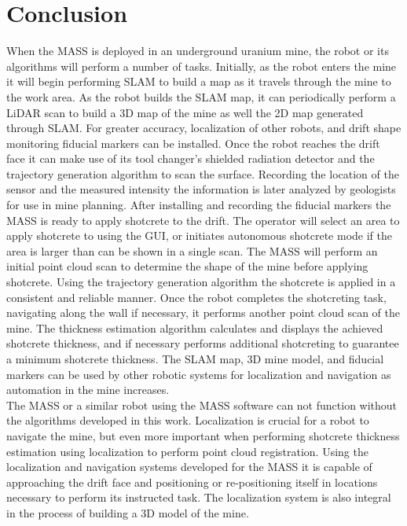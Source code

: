 \section{Conclusion}
When the MASS is deployed in an underground uranium mine, the robot or its algorithms will perform a number of tasks. Initially, as the robot enters the mine it will begin performing SLAM to build a map as it travels through the mine to the work area. As the robot builds the SLAM map, it can periodically perform a LiDAR scan to build a 3D map of the mine as well the 2D map generated through SLAM. For greater accuracy, localization of other robots, and drift shape monitoring fiducial markers can be installed. Once the robot reaches the drift face it can make use of its tool changer's shielded radiation detector and the trajectory generation algorithm to scan the surface. Recording the location of the sensor and the measured intensity the information is later analyzed by geologists for use in mine planning. After installing and recording the fiducial markers the MASS is ready to apply shotcrete to the drift. The operator will select an area to apply shotcrete to using the GUI, or initiates autonomous shotcrete mode if the area is larger than can be shown in a single scan. The MASS will perform an initial point cloud scan to determine the shape of the mine before applying shotcrete. Using the trajectory generation algorithm the shotcrete is applied in a consistent and reliable manner. Once the robot completes the shotcreting task, navigating along the wall if necessary, it performs another point cloud scan of the mine. The thickness estimation algorithm calculates and displays the achieved shotcrete thickness, and if necessary performs additional shotcreting to guarantee a minimum shotcrete thickness. The SLAM map, 3D mine model, and fiducial markers can be used by other robotic systems for localization and navigation as automation in the mine increases.\\

The MASS or a similar robot using the MASS software can not function without the algorithms developed in this work. Localization is crucial for a robot to navigate the mine, but even more important when performing shotcrete thickness estimation using localization to perform point cloud registration. Using the localization and navigation systems developed for the MASS it is capable of approaching the drift face and positioning or re-positioning itself in locations necessary to perform its instructed task. The localization system is also integral in the process of building a 3D model of the mine.\\

